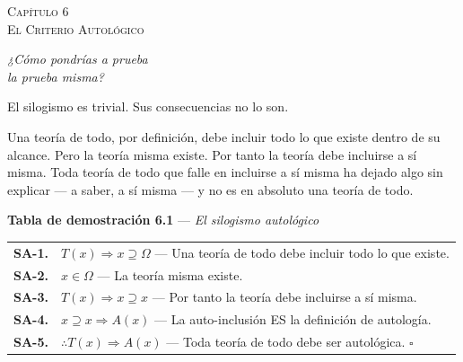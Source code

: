\documentclass[10pt, openany, oneside]{book}
\renewcommand{\footnotesize}{\fontsize{8.5}{11}\selectfont}
\renewcommand{\large}{\fontsize{11.5}{14}\selectfont}
\renewcommand{\huge}{\fontsize{17}{21}\selectfont}
\begin{document}
\newpage

\begin{center}
    {\huge\scshape Capítulo 6}\\[0.3em]
    {\large\scshape El Criterio Autológico}
\end{center}

\vspace{1.5em}

\begin{center}
    \itshape
    ¿Cómo pondrías a prueba\\
    la prueba misma?
\end{center}

\vspace{2em}


\noindent El silogismo es trivial. Sus consecuencias no lo son.

Una teoría de todo, por definición, debe incluir todo lo que existe dentro de su alcance. Pero la teoría misma existe. Por tanto la teoría debe incluirse a sí misma. Toda teoría de todo que falle en incluirse a sí misma ha dejado algo sin explicar --- a saber, a sí misma --- y no es en absoluto una teoría de todo.

\vspace{0.5em}

\textbf{Tabla de demostración 6.1} --- \textit{El silogismo autológico}

\vspace{0.5em}

{\footnotesize
\noindent\begin{tabular}{r p{}}
\textbf{SA-1.} & $T(x) \Rightarrow x \supseteq \Omega$ --- Una teoría de todo debe incluir todo lo que existe. \\[0.3em]
\textbf{SA-2.} & $x \in \Omega$ --- La teoría misma existe. \\[0.3em]
\textbf{SA-3.} & $T(x) \Rightarrow x \supseteq x$ --- Por tanto la teoría debe incluirse a sí misma. \\[0.3em]
\textbf{SA-4.} & $x \supseteq x \Rightarrow A(x)$ --- La auto-inclusión ES la definición de autología. \\[0.3em]
\textbf{SA-5.} & $\therefore T(x) \Rightarrow A(x)$ --- Toda teoría de todo debe ser autológica. $\square$ \\[0.3em]
\end{tabular}
}
\end{document}
